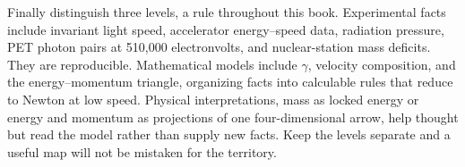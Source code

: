 \begin{mainline}
Finally distinguish three levels, a rule throughout this book. Experimental facts include invariant light speed, accelerator energy--speed data, radiation pressure, PET photon pairs at 510,000 electronvolts, and nuclear-station mass deficits. They are reproducible. Mathematical models include \(\gamma\), velocity composition, and the energy--momentum triangle, organizing facts into calculable rules that reduce to Newton at low speed. Physical interpretations, mass as locked energy or energy and momentum as projections of one four-dimensional arrow, help thought but read the model rather than supply new facts. Keep the levels separate and a useful map will not be mistaken for the territory.
\end{mainline}


